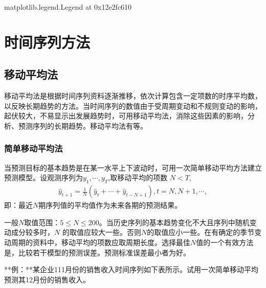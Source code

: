\documentclass[letterpaper,10pt,english]{sphinxmanual}
\begin{document}
\begin{sphinxVerbatim}[commandchars=\\\{\}]
\PYGZlt{}matplotlib.legend.Legend at 0x12e2fc610\PYGZgt{}
\end{sphinxVerbatim}

\noindent{}


\section{时间序列方法}
\label{\detokenize{docs/prediction_model:id10}}

\subsection{移动平均法}
\label{\detokenize{docs/prediction_model:id11}}
移动平均法是根据时间序列资料逐渐推移，依次计算包含一定项数的时序平均数，以反映长期趋势的方法。当时间序列的数值由于受周期变动和不规则变动的影响，起伏较大，不易显示出发展趋势时，可用移动平均法，消除这些因素的影响，分析、预测序列的长期趋势。移动平均法有等。


\subsubsection{简单移动平均法}
\label{\detokenize{docs/prediction_model:id12}}
当预测目标的基本趋势是在某一水平上下波动时，可用一次简单移动平均方法建立预测模型。设观测序列为\(y_{1}, \cdots, y_{T}\),取移动平均的项数 \(N < T\),
\begin{equation*}
\begin{split}
\hat{y}_{t+1}=\frac{1}{N}\left(\hat{y}_{t}+\cdots+\hat{y}_{t-N+1}\right), t=N, N+1, \cdots,
\end{split}
\end{equation*}
即：最近\(N\)期序列值的平均值作为未来各期的预测结果。

一般\(N\)取值范围：\(5 \leq N \leq 200\)。当历史序列的基本趋势变化不大且序列中随机变动成分较多时，\(N\) 的取值应较大一些。否则\(N\)的取值应小一些。在有确定的季节变动周期的资料中，移动平均的项数应取周期长度。选择最佳\(N\)值的一个有效方法是，比较若干模型的预测误差。预测标准误差最小者为好。

**例：**某企业1\sphinxhyphen{}11月份的销售收入时间序列如下表所示。试用一次简单移动平均预测其12月份的销售收入。
\end{document}
